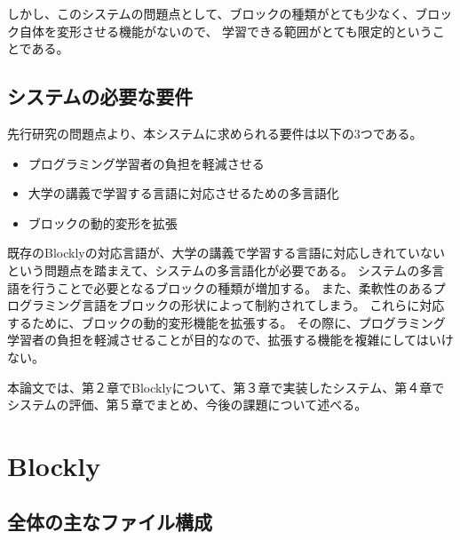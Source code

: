 \documentclass{eniepaper}
\begin{document}
 しかし、このシステムの問題点として、ブロックの種類がとても少なく、ブロック自体を変形させる機能がないので、
 学習できる範囲がとても限定的ということである。
 
 \newpage
 
    \section{システムの必要な要件}
    
先行研究の問題点より、本システムに求められる要件は以下の3つである。
 
\begin{itemize}
\item プログラミング学習者の負担を軽減させる
\item 大学の講義で学習する言語に対応させるための多言語化
\item ブロックの動的変形を拡張
\end{itemize} 

既存のBlocklyの対応言語が、大学の講義で学習する言語に対応しきれていないという問題点を踏まえて、システムの多言語化が必要である。
システムの多言語を行うことで必要となるブロックの種類が増加する。
また、柔軟性のあるプログラミング言語をブロックの形状によって制約されてしまう。
これらに対応するために、ブロックの動的変形機能を拡張する。
その際に、プログラミング学習者の負担を軽減させることが目的なので、拡張する機能を複雑にしてはいけない。

本論文では、第２章でBlocklyについて、第３章で実装したシステム、第４章でシステムの評価、第５章でまとめ、今後の課題について述べる。


   \chapter{Blockly}
   
   \section{全体の主なファイル構成}
   
\end{document}
